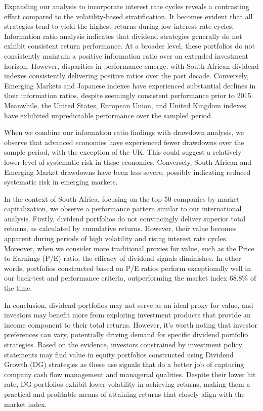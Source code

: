 \documentclass[11pt,preprint, authoryear]{elsarticle}
\numberwithin{equation}{section}
\numberwithin{figure}{section}
\numberwithin{table}{section}
\begin{document}
Expanding our analysis to incorporate interest rate cycles reveals a
contrasting effect compared to the volatility-based stratification. It
becomes evident that all strategies tend to yield the highest returns
during low interest rate cycles. Information ratio analysis indicates
that dividend strategies generally do not exhibit consistent return
performance. At a broader level, these portfolios do not consistently
maintain a positive information ratio over an extended investment
horizon. However, disparities in performance emerge, with South African
dividend indexes consistently delivering positive ratios over the past
decade. Conversely, Emerging Markets and Japanese indexes have
experienced substantial declines in their information ratios, despite
seemingly consistent performance prior to 2015. Meanwhile, the United
States, European Union, and United Kingdom indexes have exhibited
unpredictable performance over the sampled period.

When we combine our information ratio findings with drawdown analysis,
we observe that advanced economies have experienced fewer drawdowns over
the sample period, with the exception of the UK. This could suggest a
relatively lower level of systematic risk in these economies.
Conversely, South African and Emerging Market drawdowns have been less
severe, possibly indicating reduced systematic risk in emerging markets.

In the context of South Africa, focusing on the top 50 companies by
market capitalization, we observe a performance pattern similar to our
international analysis. Firstly, dividend portfolios do not convincingly
deliver superior total returns, as calculated by cumulative returns.
However, their value becomes apparent during periods of high volatility
and rising interest rate cycles. Moreover, when we consider more
traditional proxies for value, such as the Price to Earnings (P/E)
ratio, the efficacy of dividend signals diminishes. In other words,
portfolios constructed based on P/E ratios perform exceptionally well in
our back-test and performance criteria, outperforming the market index
68.8\% of the time.

In conclusion, dividend portfolios may not serve as an ideal proxy for
value, and investors may benefit more from exploring investment products
that provide an income component to their total returns. However, it's
worth noting that investor preferences can vary, potentially driving
demand for specific dividend portfolio strategies. Based on the
evidence, investors constrained by investment policy statements may find
value in equity portfolios constructed using Dividend Growth (DG)
strategies as these use signals that do a better job of capturing
company cash flow management and managerial qualities. Despite their
lower hit rate, DG portfolios exhibit lower volatility in achieving
returns, making them a practical and profitable means of attaining
returns that closely align with the market index.
\end{document}
